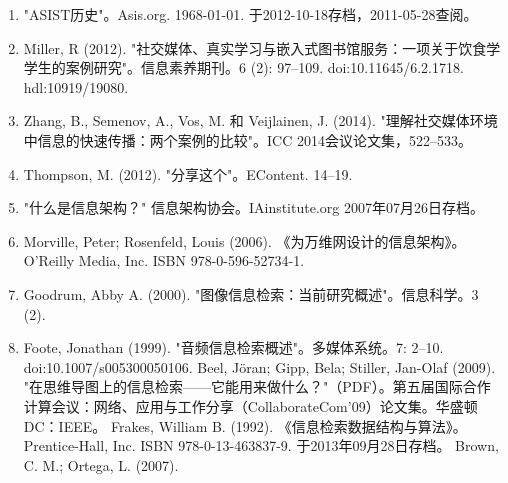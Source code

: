 \begin{enumerate}
\item "ASIST历史"。Asis.org. 1968-01-01. 于2012-10-18存档，2011-05-28查阅。  
\item Miller, R (2012). "社交媒体、真实学习与嵌入式图书馆服务：一项关于饮食学学生的案例研究"。信息素养期刊。6 (2): 97–109. doi:10.11645/6.2.1718. hdl:10919/19080.  
\item Zhang, B., Semenov, A., Vos, M. 和 Veijlainen, J. (2014). "理解社交媒体环境中信息的快速传播：两个案例的比较"。ICC 2014会议论文集，522–533。  
\item Thompson, M. (2012). "分享这个"。EContent. 14–19.  
\item "什么是信息架构？" 信息架构协会。IAinstitute.org 2007年07月26日存档。  
\item Morville, Peter; Rosenfeld, Louis (2006). 《为万维网设计的信息架构》。O'Reilly Media, Inc. ISBN 978-0-596-52734-1.  
\item Goodrum, Abby A. (2000). "图像信息检索：当前研究概述"。信息科学。3 (2).  
\item Foote, Jonathan (1999). "音频信息检索概述"。多媒体系统。7: 2–10. doi:10.1007/s005300050106.  
Beel, Jöran; Gipp, Bela; Stiller, Jan-Olaf (2009). "在思维导图上的信息检索——它能用来做什么？"（PDF）。第五届国际合作计算会议：网络、应用与工作分享（CollaborateCom'09）论文集。华盛顿DC：IEEE。  
Frakes, William B. (1992). 《信息检索数据结构与算法》。Prentice-Hall, Inc. ISBN 978-0-13-463837-9. 于2013年09月28日存档。  
Brown, C. M.; Ortega, L. (2007). 
\end{enumerate}